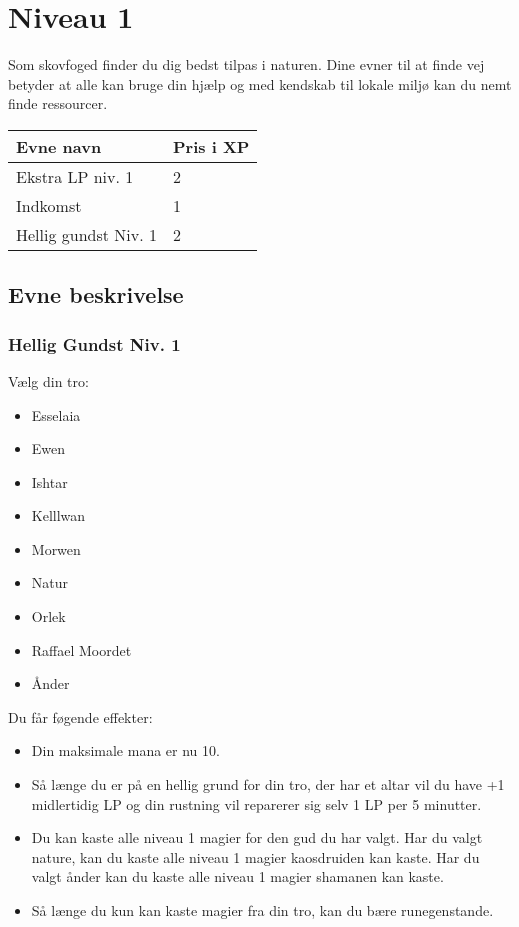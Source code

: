 \chapter{Niveau 1}

Som skovfoged finder du dig bedst tilpas i naturen. Dine evner til at finde vej betyder at alle kan bruge din hjælp og med kendskab til lokale miljø kan du nemt finde ressourcer.

\begin{table}[H]
    \centering
    \begin{tabular}{|p{}|p{}|}
    \rowcolor{cerulean!80}\hline
        Evne navn & Pris i XP \\\hline
        Ekstra LP niv. 1 &2\\\hline 
        Indkomst & 1\\\hline
        Hellig gundst Niv. 1 &2\\\hline
    \end{tabular}
\end{table}

\section{Evne beskrivelse}







\subsection{Hellig Gundst Niv. 1}
Vælg din tro: 
\begin{itemize}
    \item Esselaia
    \item Ewen
    \item Ishtar
    \item Kelllwan
    \item Morwen
    \item Natur
    \item Orlek
    \item Raffael Moordet
    \item Ånder
\end{itemize}

Du får føgende effekter:
\begin{itemize}
    \item Din maksimale mana er nu 10.
    \item Så længe du er på en hellig grund for din tro, der har et altar vil du have +1 midlertidig LP og din rustning vil reparerer sig selv 1 LP per 5 minutter.
    \item Du kan kaste alle niveau 1 magier for den gud du har valgt. Har du valgt nature, kan du kaste alle niveau 1 magier kaosdruiden kan kaste. Har du valgt ånder kan du kaste alle niveau 1 magier shamanen kan kaste.
    \item Så længe du kun kan kaste magier fra din tro, kan du bære runegenstande.
\end{itemize}